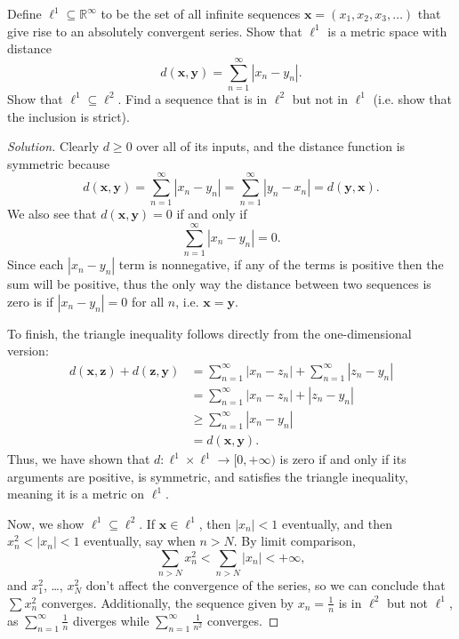 \documentclass[11pt]{scrartcl}
\providecommand{\RR}{\mathbb R}
\theoremstyle{problem}
\newenvironment{problem}[1]
{\renewcommand\theinnercustomthm{#1}\innercustomthm}
{\endinnercustomthm}
\theoremstyle{remark}
\newenvironment{soln}{\begin{proof}[Solution]}{\end{proof}}
\begin{document}
\begin{problem}{10}
	Define $\ell^1\subseteq\RR^{\infty}$ to be the set of
	all infinite sequences $\mathbf x = (x_1, x_2, x_3, \dots)$
	that give rise to an absolutely convergent series.
	Show that $\ell^1$ is a metric space with distance
	\[d(\mathbf x, \mathbf y) = {\sum_{n=1}^{\infty} |x_n - y_n|}.\]
	Show that $\ell^1\subseteq\ell^2$.
	Find a sequence that is in $\ell^2$ but not in $\ell^1$
	(i.e. show that the inclusion is strict).
\end{problem}

\begin{soln}
	Clearly $d \ge 0$ over all of its inputs,
	and the distance function is symmetric because
	\[d(\mathbf x, \mathbf y) = \sum_{n=1}^\infty |x_n - y_n| =
	\sum_{n=1}^\infty |y_n - x_n| = d(\mathbf y, \mathbf x).\]
	We also see that $d(\mathbf x, \mathbf y) = 0$ if and only if
	\[\sum_{n=1}^\infty |x_n - y_n| = 0.\]
	Since each $|x_n - y_n|$ term is nonnegative,
	if any of the terms is positive then the sum will be positive,
	thus the only way the distance between two sequences is zero
	is if $|x_n - y_n| = 0$ for all $n$, i.e. $\mathbf x = \mathbf y$.
	
	To finish, the triangle inequality follows directly
	from the one-dimensional version:
	\begin{align*}
		d(\mathbf x, \mathbf z) + d(\mathbf z, \mathbf y) &=
		\sum_{n=1}^\infty |x_n - z_n| + \sum_{n=1}^\infty |z_n - y_n|\\
		&= \sum_{n=1}^\infty |x_n - z_n| + |z_n - y_n|\\
		&\ge \sum_{n=1}^\infty |x_n - y_n|\\
		&= d(\mathbf x, \mathbf y).
	\end{align*}
	Thus, we have shown that $d\colon\ell^1\times\ell^1\to[0,+\infty)$
	is zero if and only if its arguments are positive,
	is symmetric, and
	satisfies the triangle inequality,
	meaning it is a metric on $\ell^1$.
	
	Now, we show $\ell^1\subseteq\ell^2$.
	If $\mathbf x\in\ell^1$, then $|x_n| < 1$ eventually,
	and then $x_n^2 < |x_n| < 1$ eventually, say when $n > N$.
	By limit comparison,
	\[\sum_{n > N} x_n^2 < \sum_{n > N} |x_n| < +\infty,\]
	and $x_1^2$, \dots, $x_N^2$ don't affect the convergence
	of the series, so we can conclude that $\sum x_n^2$ converges.
	Additionally, the sequence given by $x_n = \frac 1n$
	is in $\ell^2$ but not $\ell^1$, as $\sum_{n=1}^\infty \frac 1n$
	diverges while $\sum_{n=1}^{\infty} \frac 1{n^2}$ converges.
\end{soln}
\end{document}
